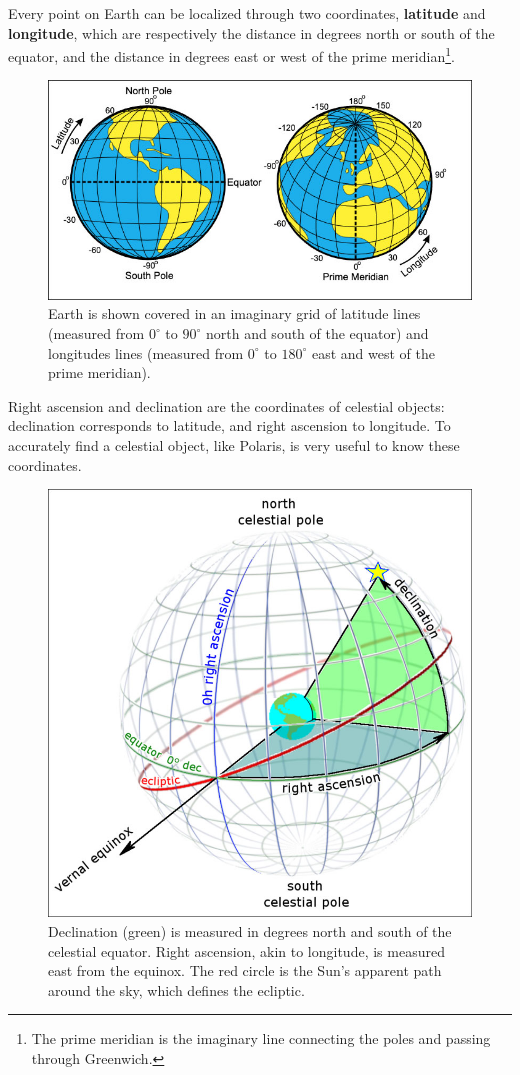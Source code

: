 \documentclass[]{article}
\begin{document}
Every point on Earth can be localized through two coordinates, \textbf{latitude} and \textbf{longitude}, which are respectively the distance in degrees north or south of the equator, and the distance in degrees east or west of the prime meridian\footnote{The prime meridian is the imaginary line connecting the poles and passing through Greenwich.}. 

\begin{figure}[H]
	\centering
	\includegraphics[width=0.5\linewidth]{images/background/RA-Dec-Latitude-longitude-wiki-public-domain-cc1.0}
	\caption{Earth is shown covered in an imaginary grid of latitude lines (measured from $0^{\circ}$ to $90^{\circ}$ north and south of the equator) and longitudes lines (measured from $0^{\circ}$ to $180^{\circ}$ east and west of the prime meridian).}
	\label{fig:latlon}
\end{figure}

Right ascension and declination are the coordinates of celestial objects: declination corresponds to latitude, and right ascension to longitude. To accurately find a celestial object, like Polaris, is very useful to know these coordinates. 

\begin{figure}[H]
	\centering
	\includegraphics[width=0.5\linewidth]{images/background/RA-Dec-wiki-Tom-RuenCC-BY-SA-3.0.jpg}
	\caption{Declination (green) is measured in degrees north and south of the celestial equator. Right ascension, akin to longitude, is measured east from the equinox. The red circle is the Sun's apparent path around the sky, which defines the ecliptic.}
	\label{fig:radec}
\end{figure}
\end{document}
